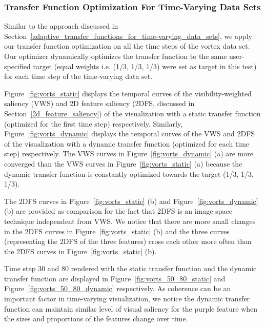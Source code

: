 \subsubsection{Transfer Function Optimization For Time-Varying Data Sets}
Similar to the approach discussed in Section~\ref{adaptive_transfer_functions_for_time-varying_data_sets}, we apply our transfer function optimization on all the time steps of the vortex data set. Our optimizer dynamically optimizes the transfer function to the same user-specified target (equal weights i.e. (1/3, 1/3, 1/3) were set as target in this test) for each time step of the time-varying data set. 

Figure~\ref{fig:vorts_static} displays the temporal curves of the visibility-weighted saliency (VWS) and 2D feature saliency (2DFS, discussed in Section~\ref{2d_feature_saliency}) of the visualization with a static transfer function (optimized for the first time step) respectively.
Similarly, Figure~\ref{fig:vorts_dynamic} displays the temporal curves of the VWS and 2DFS of the visualization with a dynamic transfer function (optimized for each time step) respectively.
The VWS curves in Figure~\ref{fig:vorts_dynamic} (a) are more converged than the VWS curves in Figure~\ref{fig:vorts_static} (a) because the dynamic transfer function is constantly optimized towards the target (1/3, 1/3, 1/3).

The 2DFS curves in Figure~\ref{fig:vorts_static} (b) and Figure~\ref{fig:vorts_dynamic} (b) are provided as comparison for the fact that 2DFS is an image space technique independent from VWS. We notice that there are more small changes in the 2DFS curves in Figure~\ref{fig:vorts_static} (b) and the three curves (representing the 2DFS of the three features) cross each other more often than the 2DFS curves in Figure~\ref{fig:vorts_static} (b).

Time step 30 and 80 rendered with the static transfer function and the dynamic transfer function are displayed in Figure~\ref{fig:vorts_50_80_static} and Figure~\ref{fig:vorts_50_80_dynamic} respectively. As coherence can be an important factor in time-varying visualization, we notice the dynamic transfer function can maintain similar level of visual saliency for the purple feature when the sizes and proportions of the features change over time.


%

